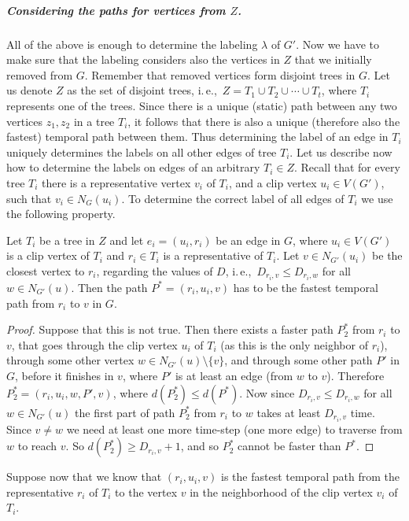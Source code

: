 \documentclass[a4paper,UKenglish,cleveref, autoref, thm-restate, anonymous]{lipics-v2021}
\newcommand{\ie}{i.\,e.,\ }
\begin{document}
\subparagraph{\boldmath Considering the paths for vertices from $Z$.}
All of the above is enough to determine the labeling $\lambda$ of $G'$. Now we have to make sure that the labeling considers also the vertices in $Z$ that we initially removed from $G$.
Remember that removed vertices form disjoint trees in $G$.
Let us denote $Z$ as the set of disjoint trees, \ie $Z = T_1 \cup T_2 \cup \cdots \cup T_t$, where $T_i$ represents one of the trees.
Since there is a unique (static) path between any two vertices $z_1, z_2$ in a tree $T_i$,
it follows that there is also a unique (therefore also the fastest) temporal path between them.
Thus determining the label of an edge in $T_i$ uniquely determines the labels on all other edges of tree $T_i$.
Let us describe now how to determine the labels on edges of an arbitrary $T_i \in Z$.
Recall that for every tree $T_i$ there is a representative vertex $v_i$ of $T_i$,
and a clip vertex $u_i \in V(G')$, such that $v_i \in N_G(u_i)$.
To determine the correct label of all edges of $T_i$ we use the following property.
\begin{lemma}
Let $T_i$ be a tree in $Z$ and let $e_i = (u_i,r_i)$ be an edge in $G$, where $u_i \in V(G')$ is a clip vertex of $T_i$ and $r_i \in T_i$ is a representative of $T_i$.
Let $v \in N_{G'}(u_i)$ be the closest vertex to $r_i$, regarding the values of $D$, \ie  $D_{r_i,v} \leq D_{r_i,w}$ for all $w \in N_{G'}(u)$.
Then the path $P^*=(r_i,u_i,v)$ has to be the fastest temporal path from $r_i$ to $v$ in $G$.
\end{lemma}
\begin{proof}
Suppose that this is not true.
Then there exists a faster path $P^*_2$ from $r_i$ to $v$, that goes through the clip vertex $u_i$ of $T_i$ (as this is the only neighbor of $r_i$), through some other vertex $w \in N_{G'}(u) \setminus \{v \}$, 
and through some other path $P'$ in $G$, before it finishes in $v$, where $P'$ is at least an edge (from $w$ to $v$). 
Therefore $P^*_2= (r_i,u_i,w,P',v)$, where $d(P^*_2) \leq d(P^*)$.
Now since $D_{r_i,v} \leq D_{r_i,w}$ for all $ w\in N_{G'}(u)$ the first part of path $P^*_2$ from $r_i$ to $w$ takes at least $D_{r_i,v}$ time.
Since $v \neq w$ we need at least one more time-step (one more edge) to traverse from $w$ to reach $v$. 
So $d(P^*_2) \geq D_{r_i,v} + 1$, and so $P^*_2$ cannot be faster than $P^*$.
\end{proof}
Suppose now that we know that 
$(r_i,u_i,v)$ is the fastest temporal path from the representative $r_i$ of $T_i$ to the vertex $v$ in the neighborhood of the clip vertex $v_i$ of $T_i$.
\end{document}
